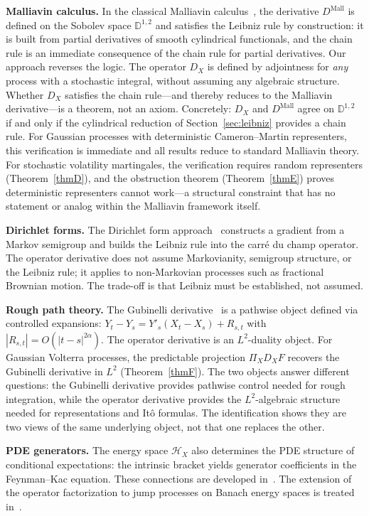 \documentclass[11pt,a4paper]{article}
\theoremstyle{plain}
\theoremstyle{definition}
\theoremstyle{remark}
\newcommand{\HX}{\mathcal{H}_X}
\begin{document}
\textbf{Malliavin calculus.} In the classical Malliavin calculus~\cite{Nualart2006}, the derivative $D^{\mathrm{Mall}}$ is defined on the Sobolev space $\mathbb{D}^{1,2}$ and satisfies the Leibniz rule by construction: it is built from partial derivatives of smooth cylindrical functionals, and the chain rule is an immediate consequence of the chain rule for partial derivatives. Our approach reverses the logic. The operator $D_X$ is defined by adjointness for \emph{any} process with a stochastic integral, without assuming any algebraic structure. Whether $D_X$ satisfies the chain rule---and thereby reduces to the Malliavin derivative---is a theorem, not an axiom. Concretely: $D_X$ and $D^{\mathrm{Mall}}$ agree on $\mathbb{D}^{1,2}$ if and only if the cylindrical reduction of Section~\ref{sec:leibniz} provides a chain rule. For Gaussian processes with deterministic Cameron--Martin representers, this verification is immediate and all results reduce to standard Malliavin theory. For stochastic volatility martingales, the verification requires random representers (Theorem~\ref{thmD}), and the obstruction theorem (Theorem~\ref{thmE}) proves deterministic representers cannot work---a structural constraint that has no statement or analog within the Malliavin framework itself.

\textbf{Dirichlet forms.} The Dirichlet form approach~\cite{MaRockner1992} constructs a gradient from a Markov semigroup and builds the Leibniz rule into the carr\'e du champ operator. The operator derivative does not assume Markovianity, semigroup structure, or the Leibniz rule; it applies to non-Markovian processes such as fractional Brownian motion. The trade-off is that Leibniz must be established, not assumed.

\textbf{Rough path theory.} The Gubinelli derivative~\cite{Gubinelli2004} is a pathwise object defined via controlled expansions: $Y_t - Y_s = Y'_s(X_t - X_s) + R_{s,t}$ with $|R_{s,t}| = O(|t-s|^{2\alpha})$. The operator derivative is an $L^2$-duality object. For Gaussian Volterra processes, the predictable projection $\Pi_X D_X F$ recovers the Gubinelli derivative in $L^2$ (Theorem~\ref{thmF}). The two objects answer different questions: the Gubinelli derivative provides pathwise control needed for rough integration, while the operator derivative provides the $L^2$-algebraic structure needed for representations and It\^o formulas. The identification shows they are two views of the same underlying object, not that one replaces the other.

\textbf{PDE generators.} The energy space $\HX$ also determines the PDE structure of conditional expectations: the intrinsic bracket yields generator coefficients in the Feynman--Kac equation. These connections are developed in~\cite{Fontes2026PDE_gen}. The extension of the operator factorization to jump processes on Banach energy spaces is treated in~\cite{Fontes2026Banach}.
\end{document}
